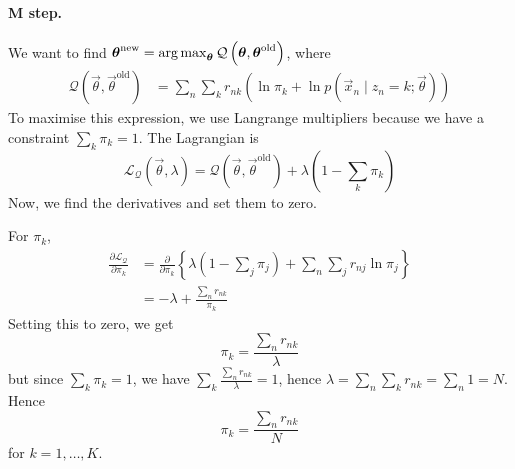 \paragraph{M step.} We want to find $\boldsymbol{\mathbf{\theta}}^{\text{new}} = \operatorname*{arg\,max}_{\boldsymbol{\mathbf{\theta}}} \mathcal Q\left(\boldsymbol{\mathbf{\theta}}, \boldsymbol{\mathbf{\theta}}^{\text{old}}\right)$, where
\begin{align*}
    \mathcal Q\left(\vec \theta, \vec \theta^{\text{old}}\right)    &= \sum_n \sum_k r_{nk} \left(\ln \pi_k + \ln p(\vec x_n \mid z_n = k; \vec \theta)\right)
\end{align*}
To maximise this expression, we use Langrange multipliers because we have a constraint $\sum_k \pi_k = 1$. The Lagrangian is
\begin{equation*}
    \mathcal L_{\mathcal Q}(\vec \theta, \lambda) = \mathcal Q\left(\vec \theta, \vec \theta^{\text{old}}\right) + \lambda \left(1 - \sum_k \pi_k\right)
\end{equation*}
Now, we find the derivatives and set them to zero.

For $\pi_k$,
\begin{align*}
    \frac{\partial \mathcal L_{\mathcal Q}}{\partial \pi_k} &= \frac{\partial}{\partial \pi_k} \left\{\lambda \left(1 - \sum_j \pi_j\right) + \sum_n \sum_j r_{nj} \ln \pi_j\right\} \\
                                                            &= -\lambda + \frac{\sum_n r_{nk}}{\pi_k}
\end{align*}
Setting this to zero, we get
\begin{equation*}
    \pi_k = \frac{\sum_n r_{nk}}{\lambda}
\end{equation*}
but since $\sum_k \pi_k = 1$, we have $\sum_k \frac{\sum_n r_{nk}}{\lambda} = 1$, hence $\lambda = \sum_n \sum_k r_{nk} = \sum_n 1 = N$. Hence
\begin{equation}
    \pi_k = \frac{\sum_n r_{nk}}{N}
\end{equation}
for $k = 1, \dotsc, K$.

